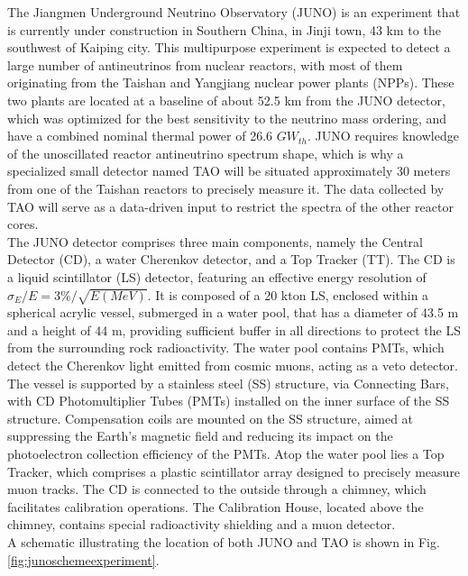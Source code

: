 The Jiangmen Underground Neutrino Observatory (JUNO) is an experiment that is currently under construction in Southern China, in Jinji town, 43 km to the southwest of Kaiping city. This multipurpose experiment is expected to detect a large number of antineutrinos from nuclear reactors, with most of them originating from the Taishan and Yangjiang nuclear power plants (NPPs). These two plants are located at a baseline of about 52.5 km from the JUNO detector, which was optimized for the best sensitivity to the neutrino mass ordering, and have a combined nominal thermal power of 26.6 $GW_{th}$. JUNO requires knowledge of the unoscillated reactor antineutrino spectrum shape, which is why a specialized small detector named TAO will be situated approximately 30 meters from one of the Taishan reactors to precisely measure it. The data collected by TAO will serve as a data-driven input to restrict the spectra of the other reactor cores.\\


The JUNO detector comprises three main components, namely the Central Detector (CD), a water Cherenkov detector, and a Top Tracker (TT). The CD is a liquid scintillator (LS) detector, featuring an effective energy resolution of $\sigma_E/E =3\% / \sqrt{E (MeV)}$. It is composed of a 20 kton LS, enclosed within a spherical acrylic vessel, submerged in a water pool, that has a diameter of 43.5 m and a height of 44 m, providing sufficient buffer in all directions to protect the LS from the surrounding rock radioactivity. The water pool contains PMTs, which detect the Cherenkov light emitted from cosmic muons, acting as a veto detector.
The vessel is supported by a stainless steel (SS) structure, via Connecting Bars, with CD Photomultiplier Tubes (PMTs) installed on the inner surface of the SS structure. 
Compensation coils are mounted on the SS structure, aimed at suppressing the Earth's magnetic field and reducing its impact on the photoelectron collection efficiency of the PMTs. 
Atop the water pool lies a Top Tracker, which comprises a plastic scintillator array designed to precisely measure muon tracks. The CD is connected to the outside through a chimney, which facilitates calibration operations. The Calibration House, located above the chimney, contains special radioactivity shielding and a muon detector.\\

A schematic illustrating the location of both JUNO and TAO is shown in Fig. \ref{fig:junoschemeexperiment}.

